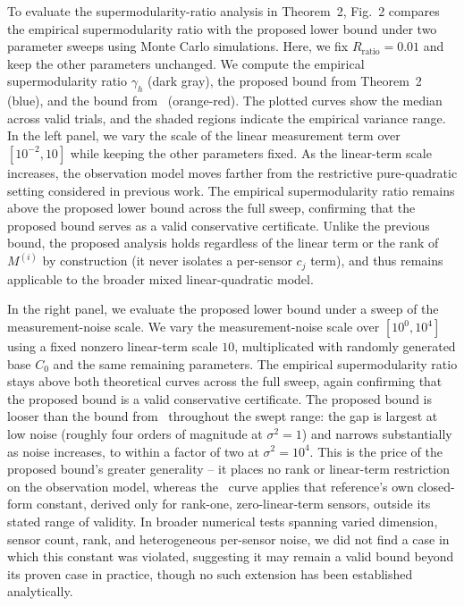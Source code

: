 \documentclass[letterpaper, 10 pt, conference]{ieeeconf}  %
\begin{document}
To evaluate the supermodularity-ratio analysis in Theorem~2, Fig.~2 compares the empirical supermodularity ratio with the proposed lower bound under two parameter sweeps using Monte Carlo simulations. Here, we fix $R_{\mathrm{ratio}}=0.01$ and keep the other parameters unchanged. We compute the empirical supermodularity ratio $\gamma_h$ (dark gray), the proposed bound from Theorem~2 (blue), and the bound from~\cite{c19} (orange-red). The plotted curves show the median across valid trials, and the shaded regions indicate the empirical variance range. In the left panel, we vary the scale of the linear measurement term over $[10^{-2}, 10]$ while keeping the other parameters fixed. As the linear-term scale increases, the observation model moves farther from the restrictive pure-quadratic setting considered in previous work. The empirical supermodularity ratio remains above the proposed lower bound across the full sweep, confirming that the proposed bound serves as a valid conservative certificate. Unlike the previous bound, the proposed analysis holds regardless of the linear term or the rank of $M^{(i)}$ by construction (it never isolates a per-sensor $c_j$ term), and thus remains applicable to the broader mixed linear-quadratic model.



In the right panel, we evaluate the proposed lower bound under a sweep of the measurement-noise scale. We vary the measurement-noise scale over $[10^{0},10^{4}]$ using a fixed nonzero linear-term scale $10$, multiplicated with randomly generated base $C_0$ and the same remaining parameters. The empirical supermodularity ratio stays above both theoretical curves across the full sweep, again confirming that the proposed bound is a valid conservative certificate. The proposed bound is looser than the bound from~\cite{c19} throughout the swept range: the gap is largest at low noise (roughly four orders of magnitude at $\sigma^2=1$) and narrows substantially as noise increases, to within a factor of two at $\sigma^2=10^4$. This is the price of the proposed bound's greater generality -- it places no rank or linear-term restriction on the observation model, whereas the~\cite{c19} curve applies that reference's own closed-form constant, derived only for rank-one, zero-linear-term sensors, outside its stated range of validity. In broader numerical tests spanning varied dimension, sensor count, rank, and heterogeneous per-sensor noise, we did not find a case in which this constant was violated, suggesting it may remain a valid bound beyond its proven case in practice, though no such extension has been established analytically.
\end{document}
